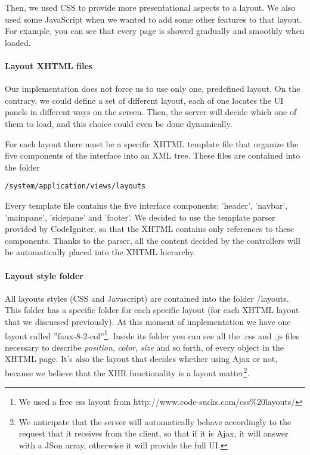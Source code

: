 Then, we used CSS to provide more presentational aspects to a layout. We also used some JavaScript when we wanted to add some other features to that layout. For example, you can see that every page is showed gradually and smoothly when loaded.

\paragraph{Layout XHTML files}
Our implementation does not force us to use only one, predefined layout. On the contrary, we could define a set of different layout, each of one locates the UI panels in different ways on the screen. Then, the server will decide which one of them to load, and this choice could even be done dynamically.

For each layout there must be a specific XHTML template file that organize the five components of the interface into an XML tree. These files are contained into the folder
\begin{verbatim}
/system/application/views/layouts
\end{verbatim}
Every template file contains the five interface components: 'header', 'navbar', 'mainpane', 'sidepane' and 'footer'. We decided to use the template parser provided by CodeIgniter, so that the XHTML contains only references to these components. Thanks to the parser, all the content decided by the controllers will be automatically placed into the XHTML hierarchy.

\paragraph{Layout style folder}
All layouts styles (CSS and Javascript) are contained into the folder /layouts. This folder has a specific folder for each specific layout (for each XHTML layout that we discussed previously). At this moment of implementation we have one layout called ''faux-8-2-col''\footnote{We used a free css layout from http://www.code-sucks.com/css\%20layouts/}. Inside its folder you can see all the .css and .js files necessary to describe \emph{position}, \emph{color}, \emph{size} and so forth, of every object in the XHTML page. It's also the layout that decides whether using Ajax or not, because we believe that the XHR functionality is a layout matter\footnote{We anticipate that the server will automatically behave accordingly to the request that it receives from the client, so that if it is Ajax, it will answer with a JSon array, otherwise it will provide the full UI.}.

